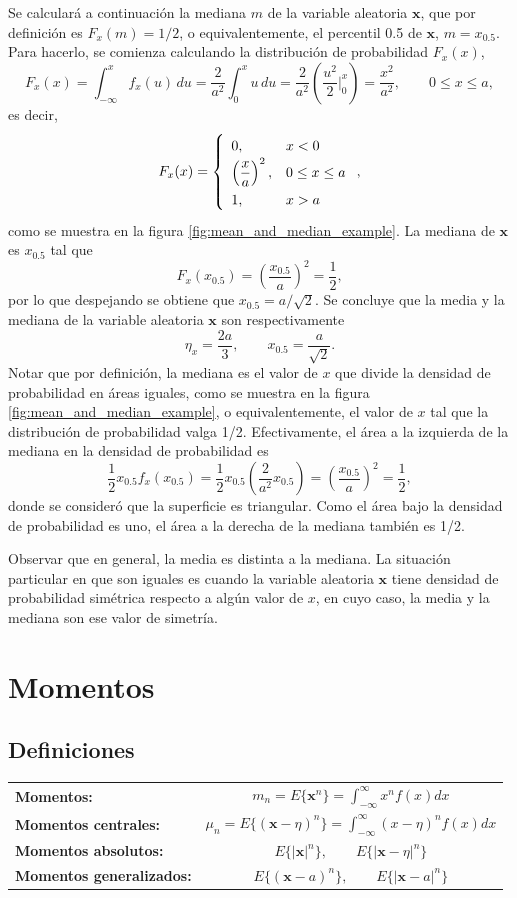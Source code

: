 \documentclass[a4paper]{report}
\newcommand{\x}{\mathbf{x}}
\begin{document}
Se calculará a continuación la mediana \(m\) de la variable aleatoria \(\x\), que por definición es \(F_x(m)=1/2\), o equivalentemente, el percentil 0.5 de \(\x\), \(m=x_{0.5}\). Para hacerlo, se comienza calculando la distribución de probabilidad \(F_x(x)\),
\[
 F_x(x)=\int_{-\infty}^xf_x(u)\,du
   =\frac{2}{a^2}\int_0^xu\,du
   =\frac{2}{a^2}\left(\frac{u^2}{2}\bigg|_0^x\right)
   =\frac{x^2}{a^2},\qquad 0\leq x\leq a,
\]
es decir,
\[\def\arraystretch{1.5}
F_x(x)=\left\{
 \begin{array}{ll}
 0,&x<0\\
 \left(\dfrac{x}{a}\right)^2,&0\leq x\leq a\\
 1,&x>a
 \end{array}\right.,
\]
como se muestra en la figura \ref{fig:mean_and_median_example}. La mediana de \(\x\) es \(x_{0.5}\) tal que
\[
 F_x(x_{0.5})=\left(\dfrac{x_{0.5}}{a}\right)^2=\frac{1}{2},
\]
por lo que despejando se obtiene que \(x_{0.5}=a/\sqrt{2}\). Se concluye que la media y la mediana de la variable aleatoria \(\x\) son respectivamente
\[
 \eta_x=\frac{2a}{3},\qquad x_{0.5}=\frac{a}{\sqrt{2}}.
\]
Notar que por definición, la mediana es el valor de \(x\) que divide la densidad de probabilidad en áreas iguales, como se muestra en la figura \ref{fig:mean_and_median_example}, o equivalentemente, el valor de \(x\) tal que la distribución de probabilidad valga 1/2. Efectivamente, el área a la izquierda de la mediana en la densidad de probabilidad es
\[
 \frac{1}{2}x_{0.5}f_x(x_{0.5})=\frac{1}{2}x_{0.5}\left(\frac{2}{a^2}x_{0.5}\right)=\left(\dfrac{x_{0.5}}{a}\right)^2=\frac{1}{2},
\]
donde se consideró que la superficie es triangular. Como el área bajo la densidad de probabilidad es uno, el área a la derecha de la mediana también es 1/2. 

Observar que en general, la media es distinta a la mediana. La situación particular en que son iguales es cuando la variable aleatoria \(\x\) tiene densidad de probabilidad simétrica respecto a algún valor de \(x\), en cuyo caso, la media y la mediana son ese valor de simetría.

\section{Momentos}

\subsection{Definiciones}

\bgroup
\def\arraystretch{2.5}
\begin{tabular}{lc} 
\textbf{Momentos:} & \(\displaystyle m_n=E\{\x^n\}=\int_{-\infty}^{\infty}x^nf(x)dx\)\\ 
\textbf{Momentos centrales:} & \(\displaystyle \mu_n=E\{(\x-\eta)^n\}=\int_{-\infty}^{\infty}(x-\eta)^nf(x)dx\)\\
\textbf{Momentos absolutos:} & \(\displaystyle E\{|\x|^n\},\qquad E\{|\x-\eta|^n\}\)\\
\textbf{Momentos generalizados:} & \(\displaystyle E\{(\x-a)^n\},\qquad E\{|\x-a|^n\}\)
\end{tabular}
\egroup
\end{document}

